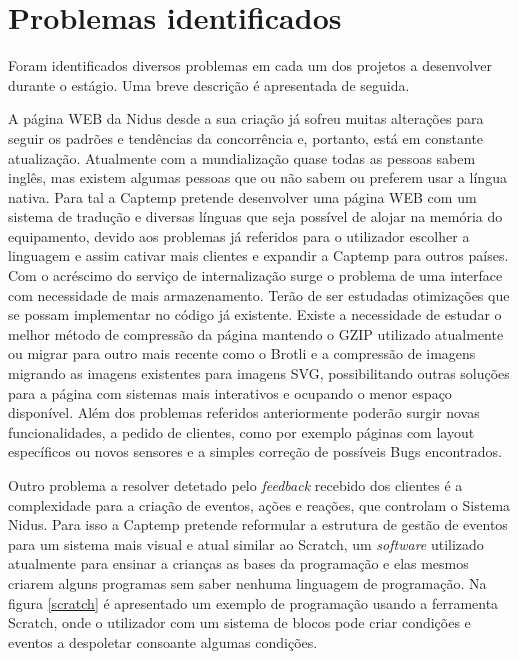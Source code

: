 \section{Problemas identificados}
Foram identificados diversos problemas em cada um dos projetos a desenvolver durante o estágio. Uma breve descrição é apresentada de seguida.
\par
A página WEB da Nidus desde a sua criação já sofreu muitas alterações para seguir os padrões e tendências da concorrência e, portanto, está em constante atualização. Atualmente com a mundialização quase todas as pessoas sabem inglês, mas existem algumas pessoas que ou não sabem ou preferem usar a língua nativa. Para tal a Captemp pretende desenvolver uma página WEB com um sistema de tradução e diversas línguas que seja possível de alojar na memória do equipamento, devido aos problemas já referidos para o utilizador escolher a linguagem e assim cativar mais clientes e expandir a Captemp para outros países. Com o acréscimo do serviço de internalização surge o problema de uma interface com necessidade de mais armazenamento. Terão de ser estudadas otimizações que se possam implementar no código já existente. Existe a necessidade de estudar o melhor método de compressão da página mantendo o GZIP utilizado atualmente ou migrar para outro mais recente como o Brotli e a compressão de imagens migrando as imagens existentes para imagens SVG, possibilitando outras soluções para a página com sistemas mais interativos e ocupando o menor espaço disponível. Além dos problemas referidos anteriormente poderão surgir novas funcionalidades, a pedido de clientes, como por exemplo páginas com layout específicos ou novos sensores e a simples correção de possíveis Bugs encontrados.
\par
Outro problema a resolver detetado pelo \textit{feedback} recebido dos clientes é a complexidade para a criação de eventos, ações e reações, que controlam o Sistema Nidus. Para isso a Captemp pretende reformular a estrutura de gestão de eventos para um sistema mais visual e atual similar ao Scratch, um \textit{software} utilizado atualmente para ensinar a crianças as bases da programação e elas mesmos criarem alguns programas sem saber nenhuma linguagem de programação. Na figura \ref{scratch} é apresentado um exemplo de programação usando a ferramenta Scratch, onde o utilizador com um sistema de blocos pode criar condições e eventos a despoletar consoante algumas condições.

